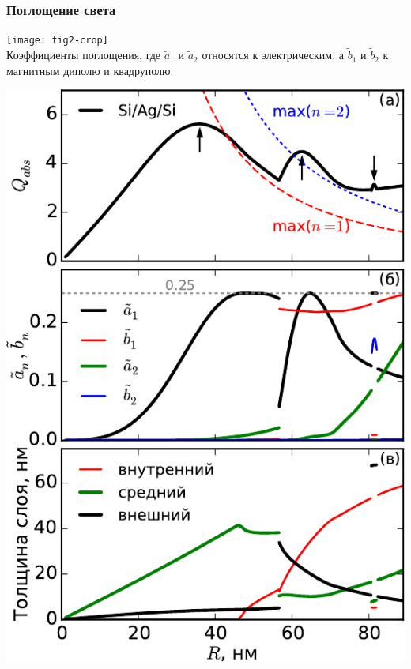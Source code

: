 \documentclass[14pt]{beamer}
\begin{document}
\begin{frame}
  \frametitle{Поглощение света}
  \small
  \begin{center}
    \footnotesize
    \texttt{[image: fig2-crop]}    \\
    Коэффициенты поглощения, где $\tilde{a}_1$ и
    $\tilde{a}_2$ относятся к электрическим, а $\tilde{b}_1$ и
    $\tilde{b}_2$ к магнитным диполю и квадруполю.
  \end{center}
\end{frame}  

\begin{frame}
  \small
  \begin{center}
    \footnotesize
    \includegraphics[width=0.57\linewidth]{2015-04-01-Qabs-SiAgSi-overview}   %
  \end{center}
\end{frame}  
\end{document}
